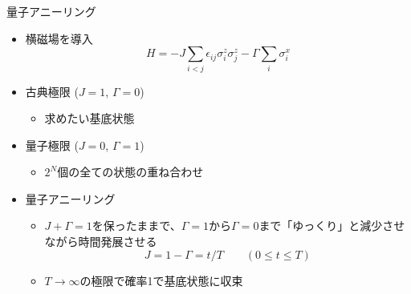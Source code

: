 \begin{frame}[t,fragile]{量子アニーリング}
  \begin{itemize}
  \item 横磁場を導入
    \[
    H = -J \sum_{i<j} \epsilon_{ij} \sigma_i^z \sigma_j^z - \Gamma \sum_i \sigma_i^x
    \]
  \item 古典極限 ($J=1$, $\Gamma=0$)
    \begin{itemize}
    \item 求めたい基底状態
    \end{itemize}
  \item 量子極限 ($J=0$, $\Gamma=1$)
    \begin{itemize}
    \item $2^N$個の全ての状態の重ね合わせ
    \end{itemize}
  \item 量子アニーリング
    \begin{itemize}
    \item $J+\Gamma=1$を保ったままで、$\Gamma=1$から$\Gamma=0$まで「ゆっくり」と減少させながら時間発展させる
      \[
      J = 1-\Gamma = t/T \qquad (0 \le t \le T)
      \]
    \item $T \rightarrow \infty$の極限で確率1で基底状態に収束
    \end{itemize}
  \end{itemize}
\end{frame}
